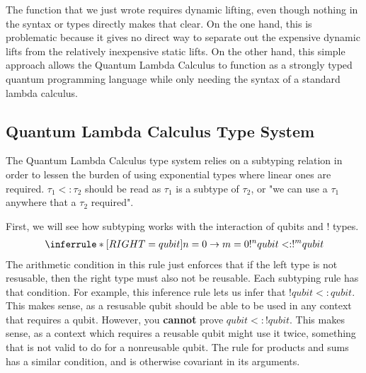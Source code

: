 The function that we just wrote requires dynamic lifting, even though nothing in the syntax or types directly makes that clear.
On the one hand, this is problematic because it gives no direct way to separate out the expensive dynamic lifts from the relatively inexpensive static lifts.
On the other hand, this simple approach allows the Quantum Lambda Calculus to function as a strongly typed quantum programming language while only needing the syntax of a standard lambda calculus.


\subsection{Quantum Lambda Calculus Type System}
The Quantum Lambda Calculus type system relies on a subtyping relation in order to lessen the burden of using exponential types where linear ones are required.
$\tau_1 <: \tau_2$ should be read as $\tau_1$ is a subtype of $\tau_2$, or "we can use a $\tau_1$ anywhere that a $\tau_2$ required".

First, we will see how subtyping works with the interaction of qubits and $!$ types.
\begin{align*}
    \inferrule*[RIGHT=qubit]{n = 0 \rightarrow m = 0}{!^nqubit <: !^m qubit}
\end{align*}
The arithmetic condition in this rule just enforces that if the left type is not resusable, then the right type must also not be reusable.
Each subtyping rule has that condition.
For example, this inference rule lets us infer that $!qubit<:qubit$.
This makes sense, as a resusable qubit should be able to be used in any context that requires a qubit.
However, you \textbf{cannot} prove $qubit <: !qubit$.
This makes sense, as a context which requires a reusable qubit might use it twice, something that is not valid to do for a nonreusable qubit. 
The rule for products and sums has a similar condition, and is otherwise covariant in its arguments.

